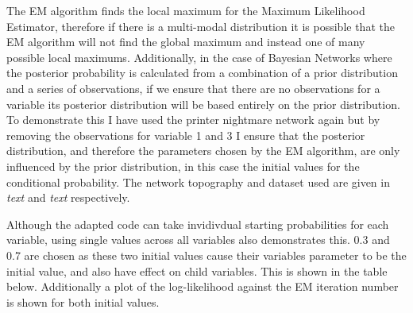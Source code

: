 \documentclass{article}
\begin{document}
The EM algorithm finds the local maximum for the Maximum Likelihood Estimator, therefore if there is a multi-modal distribution it is possible that the EM algorithm will not find the global maximum and instead one of many possible local maximums. Additionally, in the case of Bayesian Networks where the posterior probability is calculated from a combination of a prior distribution and a series of observations, if we ensure that there are no observations for a variable its posterior distribution will be based entirely on the prior distribution. To demonstrate this I have used the printer nightmare network again but by removing the observations for variable 1 and 3 I ensure that the posterior distribution, and therefore the parameters chosen by the EM algorithm, are only influenced by the prior distribution, in this case the initial values for the conditional probability. The network topography and dataset used are given in \textit{text} and \textit{text} respectively. 

Although the adapted code can take invidivdual starting probabilities for each variable, using single values across all variables also demonstrates this. 0.3 and 0.7 are chosen as these two initial values cause their variables parameter to be the initial value, and also have effect on child variables. This is shown in the table below. Additionally a plot of the log-likelihood against the EM iteration number is shown for both initial values.
\end{document}
